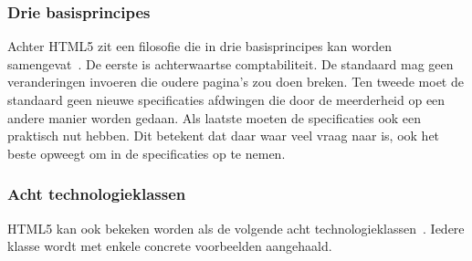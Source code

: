 \subsubsection{Drie basisprincipes}
Achter HTML5 zit een filosofie die in drie basisprincipes kan worden samengevat~\cite{MacDonald2011}.  
De eerste is achterwaartse comptabiliteit. 
De standaard mag geen veranderingen invoeren die oudere pagina's zou doen breken. 
Ten tweede moet de standaard geen nieuwe specificaties afdwingen die door de meerderheid op een andere manier worden gedaan. 
Als laatste moeten de specificaties ook een praktisch nut hebben. 
Dit betekent dat daar waar veel vraag naar is, ook het beste opweegt om in de specificaties op te nemen.

\subsubsection{Acht technologieklassen}
HTML5 kan ook bekeken worden als de volgende acht technologieklassen~\cite{W3C2012}. 
Iedere klasse wordt met enkele concrete voorbeelden aangehaald.

